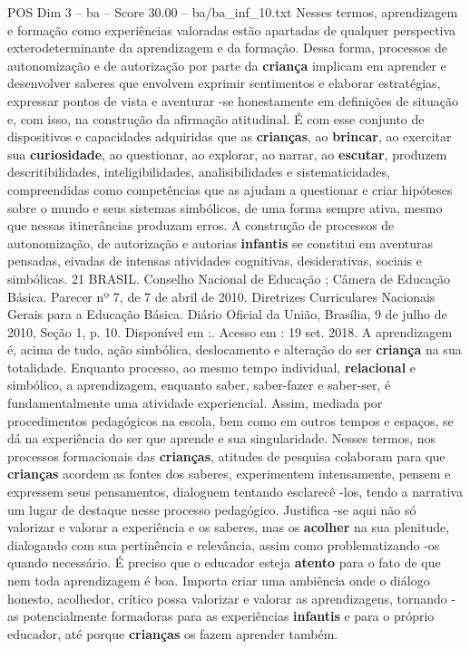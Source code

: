 \begin{textsample}{POS Dim 3 – ba – Score 30.00 – ba/ba\_inf\_10.txt}
Nesses termos, aprendizagem e formação como experiências valoradas estão apartadas de qualquer perspectiva exterodeterminante da aprendizagem e da formação.
Dessa forma, processos de autonomização e de autorização por parte da \textbf{criança} implicam em aprender e desenvolver saberes que envolvem exprimir sentimentos e elaborar estratégias, expressar pontos de vista e aventurar -se honestamente em definições de situação e, com isso, na construção da afirmação atitudinal.
É com esse conjunto de dispositivos e capacidades adquiridas que as \textbf{crianças}, ao \textbf{brincar}, ao exercitar sua \textbf{curiosidade}, ao questionar, ao explorar, ao narrar, ao \textbf{escutar}, produzem descritibilidades, inteligibilidades, analisibilidades e sistematicidades, compreendidas como competências que as ajudam a questionar e criar hipóteses sobre o mundo e seus sistemas simbólicos, de uma forma sempre ativa, mesmo que nessas itinerâncias produzam erros.
A construção de processos de autonomização, de autorização e autorias \textbf{infantis} se constitui em aventuras pensadas, eivadas de intensas atividades cognitivas, desiderativas, sociais e simbólicas. 21 BRASIL.
Conselho Nacional de Educação ; Câmera de Educação Básica.
Parecer nº 7, de 7 de abril de 2010.
Diretrizes Curriculares Nacionais Gerais para a Educação Básica.
Diário Oficial da União, Brasília, 9 de julho de 2010, Seção 1, p. 10.
Disponível em :.
Acesso em : 19 set. 2018.
A aprendizagem é, acima de tudo, ação simbólica, deslocamento e alteração do ser \textbf{criança} na sua totalidade.
Enquanto processo, ao mesmo tempo individual, \textbf{relacional} e simbólico, a aprendizagem, enquanto saber, saber-fazer e saber-ser, é fundamentalmente uma atividade experiencial.
Assim, mediada por procedimentos pedagógicos na escola, bem como em outros tempos e espaços, se dá na experiência do ser que aprende e sua singularidade.
Nesses termos, nos processos formacionais das \textbf{crianças}, atitudes de pesquisa colaboram para que \textbf{crianças} acordem as fontes dos saberes, experimentem intensamente, pensem e expressem seus pensamentos, dialoguem tentando esclarecê -los, tendo a narrativa um lugar de destaque nesse processo pedagógico.
Justifica -se aqui não só valorizar e valorar a experiência e os saberes, mas os \textbf{acolher} na sua plenitude, dialogando com sua pertinência e relevância, assim como problematizando -os quando necessário.
É preciso que o educador esteja \textbf{atento} para o fato de que nem toda aprendizagem é boa.
Importa criar uma ambiência onde o diálogo honesto, acolhedor, crítico possa valorizar e valorar as aprendizagens, tornando -as potencialmente formadoras para as experiências \textbf{infantis} e para o próprio educador, até porque \textbf{crianças} os fazem aprender também.

\end{textsample}
